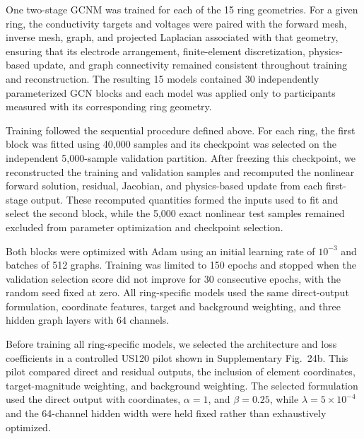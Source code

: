 \documentclass[11pt]{article}
\begin{document}
One two-stage GCNM was trained for each of the 15 ring geometries.
For a given ring, the conductivity targets and voltages were paired with the forward mesh, inverse mesh, graph, and projected Laplacian associated with that geometry, ensuring that its electrode arrangement, finite-element discretization, physics-based update, and graph connectivity remained consistent throughout training and reconstruction.
The resulting 15 models contained 30 independently parameterized GCN blocks and each model was applied only to participants measured with its corresponding ring geometry.

Training followed the sequential procedure defined above.
For each ring, the first block was fitted using 40,000 samples and its checkpoint was selected on the independent 5,000-sample validation partition.
After freezing this checkpoint, we reconstructed the training and validation samples and recomputed the nonlinear forward solution, residual, Jacobian, and physics-based update from each first-stage output.
These recomputed quantities formed the inputs used to fit and select the second block, while the 5,000 exact nonlinear test samples remained excluded from parameter optimization and checkpoint selection.

Both blocks were optimized with Adam using an initial learning rate of $10^{-3}$ and batches of 512 graphs.
Training was limited to 150 epochs and stopped when the validation selection score did not improve for 30 consecutive epochs, with the random seed fixed at zero.
All ring-specific models used the same direct-output formulation, coordinate features, target and background weighting, and three hidden graph layers with 64 channels.

Before training all ring-specific models, we selected the architecture and loss coefficients in a controlled US120 pilot shown in Supplementary Fig.~24b.
This pilot compared direct and residual outputs, the inclusion of element coordinates, target-magnitude weighting, and background weighting.
The selected formulation used the direct output with coordinates, $\alpha=1$, and $\beta=0.25$, while $\lambda=5\times10^{-4}$ and the 64-channel hidden width were held fixed rather than exhaustively optimized.
\end{document}
